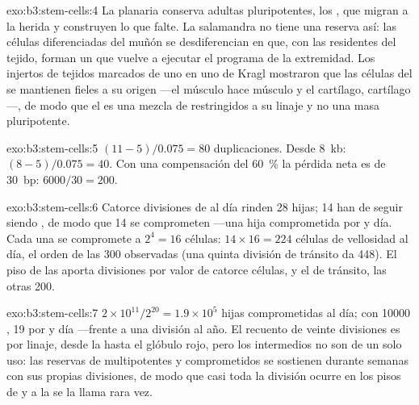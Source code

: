 \begin{solution}{exo:b3:stem-cells:4}
La planaria conserva  adultas pluripotentes, los
, que migran a la herida y construyen lo que falte. La
salamandra no tiene una reserva así: las células diferenciadas del
muñón se desdiferencian en  que, con las 
residentes del tejido, forman un  que vuelve a ejecutar el
programa de la extremidad. Los injertos de tejidos marcados de uno en
uno de Kragl mostraron que las células del  se mantienen fieles
a su origen ---el músculo hace músculo y el cartílago, cartílago---, de
modo que el  es una mezcla de  restringidos a su
linaje y no una masa pluripotente.
\end{solution}

\begin{solution}{exo:b3:stem-cells:5}
$(11 - 5)/0.075 = 80$ duplicaciones. Desde \qty{8}{kb}:
$(8 - 5)/0.075 = 40$. Con una compensación del \qty{60}{\%} la pérdida
neta es de \qty{30}{bp}: $6000/30
= 200$.
\end{solution}

\begin{solution}{exo:b3:stem-cells:6}
Catorce divisiones de  al día rinden 28 hijas; 14 han de
seguir siendo , de modo que 14 se comprometen ---una hija
comprometida por  y día. Cada una se compromete a
$2^{4} = 16$ células: $14\times 16 = 224$ células de vellosidad al día,
el orden de las \num{300} observadas (una quinta división de tránsito
da \num{448}). El piso de las  aporta divisiones por valor
de catorce células, y el de tránsito, las otras \num{200}.
\end{solution}

\begin{solution}{exo:b3:stem-cells:7}
$2\times 10^{11}/2^{20} = 1.9\times 10^{5}$ hijas comprometidas al día;
con \num{10000} , 19 por  y día ---frente a
una división al año. El recuento de veinte divisiones es por linaje,
desde la  hasta el glóbulo rojo, pero los 
intermedios no son de un solo uso: las reservas de 
multipotentes y comprometidos se sostienen durante semanas con sus
propias divisiones, de modo que casi toda la división ocurre en los
pisos de  y a la  se la llama rara vez.
\end{solution}

